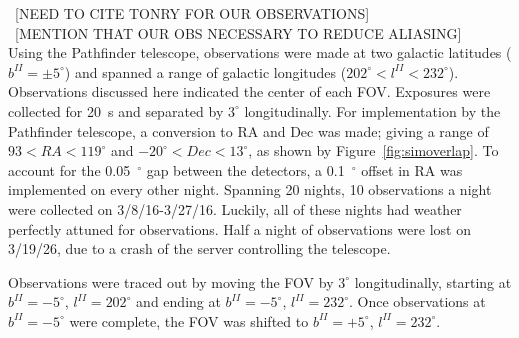 \documentclass[aps,prb,twocolumn,superscriptaddress]{revtex4-1}
\begin{document}
~[NEED TO CITE TONRY FOR OUR OBSERVATIONS]\\
~[MENTION THAT OUR OBS NECESSARY TO REDUCE ALIASING]\\

Using the Pathfinder telescope, observations were made at two galactic latitudes ($b^{II}=\pm5^{\circ}$) and spanned a range of galactic longitudes ($202^{\circ} < l^{II} < 232^{\circ}$).  Observations discussed here indicated the center of each FOV.  
Exposures were collected for 20~s and separated by $3^{\circ}$ longitudinally.  For implementation by the Pathfinder telescope, a conversion to RA and Dec was made; giving a range of $93 < RA < 119^{\circ}$ and $-20^{\circ} < Dec < 13^{\circ}$, as shown by Figure~\ref{fig:simoverlap}.  To account for the 0.05~$^{\circ}$ gap between the detectors, a 0.1~$^{\circ}$ offset in RA was implemented on every other night.  
Spanning 20 nights, 10 observations a night were collected on 3/8/16-3/27/16.  Luckily, all of these nights had weather perfectly attuned for observations.  Half a night of observations were lost on 3/19/26, due to a crash of the server controlling the telescope.


Observations were traced out by moving the FOV by $3^{\circ}$ longitudinally, starting at $b^{II}=-5^{\circ}$, $l^{II}=202^{\circ}$ and ending at $b^{II}=-5^{\circ}$, $l^{II}=232^{\circ}$.  Once observations at $b^{II}=-5^{\circ}$ were complete, the FOV was shifted to $b^{II}=+5^{\circ}$, $l^{II}=232^{\circ}$.


\end{document}
